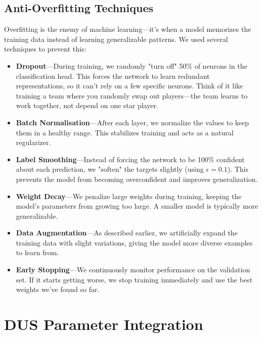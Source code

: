 \subsection{Anti-Overfitting Techniques}

Overfitting is the enemy of machine learning—it's when a model memorizes the training data instead of learning generalizable patterns. We used several techniques to prevent this:

\begin{itemize}
    \item \textbf{Dropout}---During training, we randomly "turn off" 50\% of neurons in the classification head. This forces the network to learn redundant representations, so it can't rely on a few specific neurons. Think of it like training a team where you randomly swap out players—the team learns to work together, not depend on one star player.
    
    \item \textbf{Batch Normalisation}---After each layer, we normalize the values to keep them in a healthy range. This stabilizes training and acts as a natural regularizer.
    
    \item \textbf{Label Smoothing}---Instead of forcing the network to be 100\% confident about each prediction, we "soften" the targets slightly (using $\epsilon = 0.1$). This prevents the model from becoming overconfident and improves generalization.
    
    \item \textbf{Weight Decay}---We penalize large weights during training, keeping the model's parameters from growing too large. A smaller model is typically more generalizable.
    
    \item \textbf{Data Augmentation}---As described earlier, we artificially expand the training data with slight variations, giving the model more diverse examples to learn from.
    
    \item \textbf{Early Stopping}---We continuously monitor performance on the validation set. If it starts getting worse, we stop training immediately and use the best weights we've found so far.
\end{itemize}

\section{DUS Parameter Integration}

